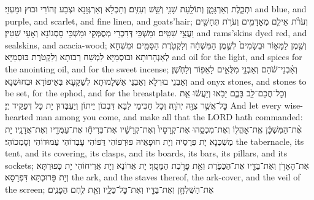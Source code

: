 {%
{וּתְכֵ֧לֶת וְאַרְגָּמָ֛ן וְתוֹלַ֥עַת שָׁנִ֖י וְשֵׁ֥שׁ וְעִזִּֽים׃}
{וְתַכְלָא וְאַרְגְּוָנָא וּצְבַע זְהוֹרִי וּבוּץ וּמַעְזֵי׃}
{and blue, and purple, and scarlet, and fine linen, and goats’hair;}{}
{וְעֹרֹ֨ת אֵילִ֧ם מְאׇדָּמִ֛ים וְעֹרֹ֥ת תְּחָשִׁ֖ים וַעֲצֵ֥י שִׁטִּֽים׃}
{וּמַשְׁכֵּי דְּדִכְרֵי מְסֻמְּקֵי וּמַשְׁכֵּי סָסְגוֹנָא וְאָעֵי שִׁטִּין׃}
{and rams’skins dyed red, and sealskins, and acacia-wood;}{}
{וְשֶׁ֖מֶן לַמָּא֑וֹר וּבְשָׂמִים֙ לְשֶׁ֣מֶן הַמִּשְׁחָ֔ה וְלִקְטֹ֖רֶת הַסַּמִּֽים׃}
{וּמִשְׁחָא לְאַנְהָרוּתָא וּבוּסְמַיָּא לִמְשַׁח רְבוּתָא וְלִקְטֹרֶת בּוּסְמַיָּא׃}
{and oil for the light, and spices for the anointing oil, and for the sweet incense;}{}
{וְאַ֨בְנֵי־שֹׁ֔הַם וְאַבְנֵ֖י מִלֻּאִ֑ים לָאֵפ֖וֹד וְלַחֹֽשֶׁן׃}
{וְאַבְנֵי בוּרְלָא וְאַבְנֵי אַשְׁלָמוּתָא לְשַׁקָּעָא בְּאֵיפוֹדָא וּבְחוּשְׁנָא׃}
{and onyx stones, and stones to be set, for the ephod, and for the breastplate.}{}
{וְכׇל־חֲכַם־לֵ֖ב בָּכֶ֑ם יָבֹ֣אוּ וְיַעֲשׂ֔וּ אֵ֛ת כׇּל־אֲשֶׁ֥ר צִוָּ֖ה יְהֹוָֽה׃}
{וְכָל חַכִּימֵי לִבָּא דִּבְכוֹן יֵיתוֹן וְיַעְבְּדוּן יָת כָּל דְּפַקֵּיד יְיָ׃}
{And let every wise-hearted man among you come, and make all that the LORD hath commanded:}{}
{אֶ֨ת־הַמִּשְׁכָּ֔ן אֶֽת־אׇהֳל֖וֹ וְאֶת־מִכְסֵ֑הוּ אֶת־קְרָסָיו֙ וְאֶת־קְרָשָׁ֔יו אֶת־בְּרִיחָ֕ו אֶת־עַמֻּדָ֖יו וְאֶת־אֲדָנָֽיו׃
}
{יָת מַשְׁכְּנָא יָת פְּרָסֵיהּ וְיָת חוּפָאֵיהּ פּוּרְפוֹהִי דַּפּוֹהִי עָבְרוֹהִי עַמּוּדוֹהִי וְסָמְכוֹהִי׃}
{the tabernacle, its tent, and its covering, its clasps, and its boards, its bars, its pillars, and its sockets;}{}
{אֶת־הָאָרֹ֥ן וְאֶת־בַּדָּ֖יו אֶת־הַכַּפֹּ֑רֶת וְאֵ֖ת פָּרֹ֥כֶת הַמָּסָֽךְ׃
}
{יָת אֲרוֹנָא וְיָת אֲרִיחוֹהִי יָת כָּפוּרְתָּא וְיָת פָּרוּכְתָּא דִּפְרָסָא׃}
{the ark, and the staves thereof, the ark-cover, and the veil of the screen;}{}
{אֶת־הַשֻּׁלְחָ֥ן וְאֶת־בַּדָּ֖יו וְאֶת־כׇּל־כֵּלָ֑יו וְאֵ֖ת לֶ֥חֶם הַפָּנִֽים׃
}
}
